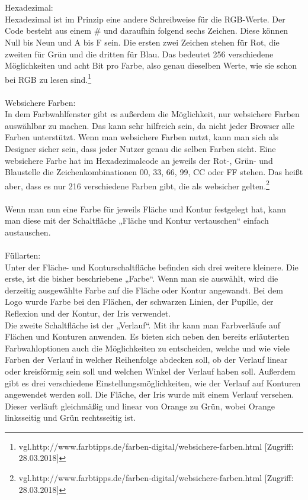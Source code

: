 \leavevmode \\
\leavevmode \\
Hexadezimal:
\leavevmode \\
Hexadezimal ist im Prinzip eine andere Schreibweise für die RGB-Werte. Der Code besteht aus einem \# und daraufhin folgend sechs Zeichen. Diese können Null bis Neun und A bis F sein. Die ersten zwei Zeichen stehen für Rot, die zweiten für Grün und die dritten für Blau. Das bedeutet 256 verschiedene Möglichkeiten und acht Bit pro Farbe, also genau dieselben Werte, wie sie schon bei RGB zu lesen sind.\footnote{\label{} vgl.http://www.farbtipps.de/farben-digital/websichere-farben.html [Zugriff: 28.03.2018]}
\leavevmode \\
\leavevmode \\
Websichere Farben:
\leavevmode \\
In dem Farbwahlfenster gibt es außerdem die Möglichkeit, nur websichere Farben auswählbar zu machen. Das kann sehr hilfreich sein, da nicht jeder Browser alle Farben unterstützt. Wenn man websichere Farben nutzt, kann man sich als Designer sicher sein, dass jeder Nutzer genau die selben Farben sieht. Eine websichere Farbe hat im Hexadezimalcode an jeweils der Rot-, Grün- und Blaustelle die Zeichenkombinationen 00, 33, 66, 99, CC oder FF stehen. Das heißt aber, dass es nur 216 verschiedene Farben gibt, die als websicher gelten.\footnote{\label{} vgl.http://www.farbtipps.de/farben-digital/websichere-farben.html [Zugriff: 28.03.2018]}
\leavevmode \\
\leavevmode \\
Wenn man nun eine Farbe für jeweils Fläche und Kontur festgelegt hat, kann man diese mit der Schaltfläche „Fläche und Kontur vertauschen“ einfach austauschen.
\leavevmode \\
\leavevmode \\
Füllarten:
\leavevmode \\
Unter der Fläche- und Konturschaltfläche befinden sich drei weitere kleinere. Die erste, ist die bisher beschriebene „Farbe“. Wenn man sie auswählt, wird die derzeitig ausgewählte Farbe auf die Fläche oder Kontur angewandt. Bei dem Logo wurde Farbe bei den Flächen, der schwarzen Linien, der Pupille, der Reflexion und der Kontur, der Iris verwendet.
\leavevmode \\
Die zweite Schaltfläche ist der „Verlauf“. Mit ihr kann man Farbverläufe auf Flächen und Konturen anwenden. Es bieten sich neben den bereits erläuterten Farbwahloptionen auch die Möglichkeiten zu entscheiden, welche und wie viele Farben der Verlauf in welcher Reihenfolge abdecken soll, ob der Verlauf linear oder kreisförmig sein soll und welchen Winkel der Verlauf haben soll. Außerdem gibt es drei verschiedene Einstellungsmöglichkeiten, wie der Verlauf auf Konturen angewendet werden soll. Die Fläche, der Iris wurde mit einem Verlauf versehen. Dieser verläuft gleichmäßig und linear von Orange zu Grün, wobei Orange linksseitig und Grün rechtsseitig ist.
